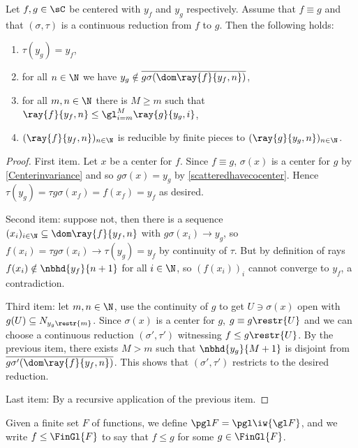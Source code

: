 \begin{proposition}\label{Rigidityofthecocenter}
Let $f,g\in \sC$ be centered with \cocenter{} $y_f$ and $y_g$ respectively. 
Assume that $f\equiv g$ and that $(\sigma,\tau)$ is a continuous reduction from $f$ to $g$. Then the following holds:
\begin{enumerate}
\item $\tau(y_g)=y_f$,
\item for all $n\in\N$ we have $y_g\notin\overline{g\sigma(\dom \ray{f}{y_f,n})}$,
\item for all $m,n\in\N$ there is $M\geq m$ such that $\ray{f}{y_f,n}\leq \gl_{i=m}^{M}\ray{g}{y_g,i}$, %
\item $(\ray{f}{y_f,n})_{n\in\N}$ is reducible by finite pieces to $(\ray{g}{y_g,n})_{n\in\N}$.
\end{enumerate}
\end{proposition}


\begin{proof}
First item. Let $x$ be a center for $f$. Since $f\equiv g$, $\sigma(x)$ is a center for $g$ by \cref{Centerinvariance} and so $g\sigma(x)=y_g$ by \cref{scatteredhavecocenter}.
Hence $\tau(y_g)= \tau g\sigma(x_f)=f(x_f)=y_f$ as desired. 

\smallskip

Second item: suppose not, then there is a sequence $(x_i)_{i\in \N}\subseteq\dom \ray{f}{y_f,n}$ with $g\sigma(x_i)\to y_g$, so $f(x_i)=\tau g\sigma(x_i) \to \tau(y_g)=y_f$ by continuity of $\tau$.
But by definition of rays $f(x_i)\notin \nbhd{y_f}{n+1}$ for all $i\in\N$, so $(f(x_i))_i$ cannot converge to $y_f$, a contradiction.

\smallskip

Third item: let $m,n\in\N$, use the continuity of $g$ to get $U\ni \sigma(x)$ open with $g(U)\subseteq N_{y_g\restr{m}}$.
Since $\sigma(x)$ is a center for $g$, $g\equiv g\restr{U}$ and we can choose a continuous reduction $(\sigma',\tau')$ witnessing $f\leq g\restr{U}$. %
By the previous item, there exists $M>m$ such that $\nbhd{y_g}{M+1}$ is disjoint from $\overline{g\sigma'(\dom \ray{f}{y_f,n})}$. This shows that $(\sigma',\tau')$ restricts to the desired reduction.
\smallskip

Last item: By a recursive application of the previous item.
\end{proof}

Given a finite set $F$ of functions, we define $\pgl F=\pgl \iw{\gl F}$, and
we write $f\leq \FinGl{F}$ to say that $f\leq g$ for some $g\in \FinGl{F}$.


